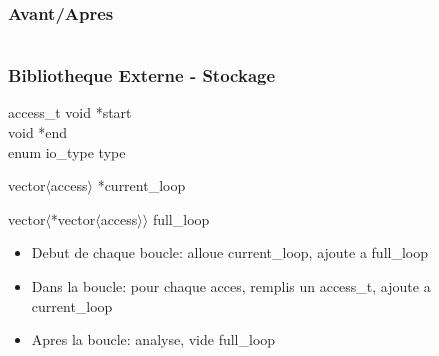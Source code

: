 \documentclass{beamer}
\begin{document}
\begin{frame}
  \frametitle{Avant/Apres}
  \begin{columns}
    \begin{column}{0.45\textwidth}
      \begin{algorithm}[H]
        \begin{algorithmic}
          \ENDFOR
        \end{algorithmic}
      \end{algorithm}
    \end{column}

    \begin{column}{0.45\textwidth}
      \begin{algorithm}[H]
        \begin{algorithmic}
          \ENDFOR
        \end{algorithmic}
      \end{algorithm}
    \end{column}
  \end{columns}
\end{frame}

\begin{frame}
  \frametitle{Bibliotheque Externe - Stockage}
  \begin{block}
    {access\_t}
    void *start\\void *end\\enum io\_type type
  \end{block}
  
  \begin{block}
    {vector$\langle$access$\rangle$ *current\_loop}
  \end{block}

  \begin{block}
    {vector$\langle$*vector$\langle$access$\rangle\rangle$ full\_loop}
  \end{block}
  
  \begin{itemize}
    \item Debut de chaque boucle: alloue current\_loop, ajoute a full\_loop
    \item Dans la boucle: pour chaque acces, remplis un access\_t, ajoute a current\_loop
    \item Apres la boucle: analyse, vide full\_loop
  \end{itemize}
\end{frame}
\end{document}
